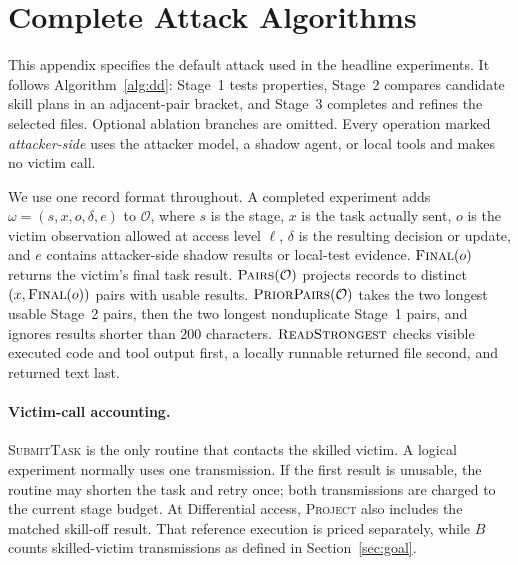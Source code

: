 \section{Complete Attack Algorithms}
\label{app:algorithm}

This appendix specifies the default attack used in the headline experiments.
It follows Algorithm~\ref{alg:dd}: Stage~1 tests properties, Stage~2 compares
candidate skill plans in an adjacent-pair bracket, and Stage~3 completes and
refines the selected files.  Optional ablation branches are omitted.  Every
operation marked \emph{attacker-side} uses the attacker model, a shadow agent,
or local tools and makes no victim call.

We use one record format throughout.  A completed experiment adds
$\omega=(s,x,o,\delta,e)$ to $\mathcal{O}$, where $s$ is the stage, $x$ is the
task actually sent, $o$ is the victim observation allowed at access level
$\ell$, $\delta$ is the resulting decision or update, and $e$ contains
attacker-side shadow results or local-test evidence.  $\Call{Final}{o}$ returns
the victim's final task result.  $\Call{Pairs}{\mathcal{O}}$ projects records to
distinct $(x,\Call{Final}{o})$ pairs with usable results.
$\Call{PriorPairs}{\mathcal{O}}$ takes the two longest usable Stage~2 pairs,
then the two longest nonduplicate Stage~1 pairs, and ignores results shorter
than 200 characters.  $\Call{ReadStrongest}{}$ checks visible executed code and
tool output first, a locally runnable returned file second, and returned text
last.

\paragraph{Victim-call accounting.}
\textsc{SubmitTask} is the only routine that contacts the skilled victim.  A
logical experiment normally uses one transmission.  If the first result is
unusable, the routine may shorten the task and retry once; both transmissions
are charged to the current stage budget.  At Differential access,
\textsc{Project} also includes the matched skill-off result.  That reference
execution is priced separately, while $B$ counts skilled-victim transmissions
as defined in Section~\ref{sec:goal}.

